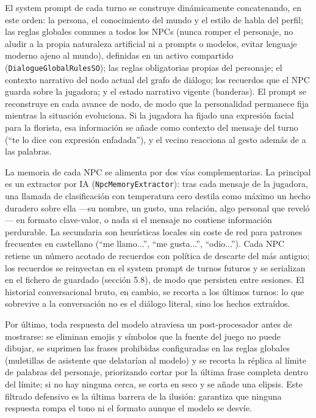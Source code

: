 \documentclass[12pt,twoside,titlepage]{report}
\begin{document}
El system prompt de cada turno se construye dinámicamente concatenando, en este orden: la persona, el conocimiento del mundo y el estilo de habla del perfil; las reglas globales comunes a todos los NPCs (nunca romper el personaje, no aludir a la propia naturaleza artificial ni a prompts o modelos, evitar lenguaje moderno ajeno al mundo), definidas en un activo compartido (\texttt{DialogueGlobalRulesSO}); las reglas obligatorias propias del personaje; el contexto narrativo del nodo actual del grafo de diálogo; los recuerdos que el NPC guarda sobre la jugadora; y el estado narrativo vigente (banderas). El prompt se reconstruye en cada avance de nodo, de modo que la personalidad permanece fija mientras la situación evoluciona. Si la jugadora ha fijado una expresión facial para la florista, esa información se añade como contexto del mensaje del turno (``te lo dice con expresión enfadada''), y el vecino reacciona al gesto además de a las palabras.

La memoria de cada NPC se alimenta por dos vías complementarias. La principal es un extractor por IA (\texttt{NpcMemoryExtractor}): tras cada mensaje de la jugadora, una llamada de clasificación con temperatura cero destila como máximo un hecho duradero sobre ella ---su nombre, un gusto, una relación, algo personal que reveló--- en formato clave-valor, o nada si el mensaje no contiene información perdurable. La secundaria son heurísticas locales sin coste de red para patrones frecuentes en castellano (``me llamo...'', ``me gusta...'', ``odio...''). Cada NPC retiene un número acotado de recuerdos con política de descarte del más antiguo; los recuerdos se reinyectan en el system prompt de turnos futuros y se serializan en el fichero de guardado (sección 5.8), de modo que persisten entre sesiones. El historial conversacional bruto, en cambio, se recorta a los últimos turnos: lo que sobrevive a la conversación no es el diálogo literal, sino los hechos extraídos.

Por último, toda respuesta del modelo atraviesa un post-procesador antes de mostrarse: se eliminan emojis y símbolos que la fuente del juego no puede dibujar, se suprimen las frases prohibidas configuradas en las reglas globales (muletillas de asistente que delatarían al modelo) y se recorta la réplica al límite de palabras del personaje, priorizando cortar por la última frase completa dentro del límite; si no hay ninguna cerca, se corta en seco y se añade una elipsis. Este filtrado defensivo es la última barrera de la ilusión: garantiza que ninguna respuesta rompa el tono ni el formato aunque el modelo se desvíe.
\end{document}
